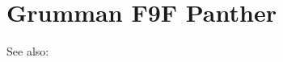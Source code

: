 \section{Grumman F9F Panther}

\begin{adclist}
\end{adclist}

See also:
\begin{typelist}
\end{typelist}